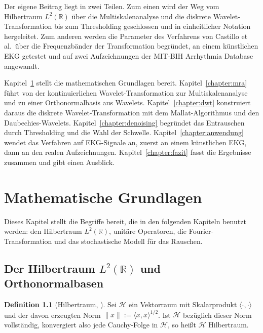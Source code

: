 \documentclass[a4paper,11pt,bibliography=totoc,listof=totoc,headinclude=true,cleardoublepage=empty,oneside]{scrbook}
\theoremstyle{plain}
\theoremstyle{definition}
\newtheorem{Definition}[Satz]{Definition}
\newcommand{\R}{\mathbb{R}}
\newcommand{\LZwei}{L^2(\R)}
\newcommand{\scal}[2]{\langle #1, #2 \rangle}
\newcommand{\norm}[1]{\lVert #1 \rVert}
\begin{document}
Der eigene Beitrag liegt in zwei Teilen. Zum einen wird der Weg vom
Hilbertraum $\LZwei$ über die Multiskalenanalyse und die diskrete
Wavelet-Transformation bis zum Thresholding geschlossen und in einheitlicher
Notation hergeleitet. Zum anderen werden die Parameter des Verfahrens von
Castillo et al.\ über die Frequenzbänder der Transformation begründet, an
einem künstlichen EKG getestet und auf zwei Aufzeichnungen der MIT-BIH
Arrhythmia Database angewandt.

Kapitel~\ref{chapter:grundlagen} stellt die mathematischen Grundlagen bereit.
Kapitel~\ref{chapter:mra} führt von der kontinuierlichen Wavelet-Transformation
zur Multiskalenanalyse und zu einer Orthonormalbasis aus Wavelets.
Kapitel~\ref{chapter:dwt} konstruiert daraus die diskrete
Wavelet-Transformation mit dem Mallat-Algorithmus und den Daubechies-Wavelets.
Kapitel~\ref{chapter:denoising} begründet das Entrauschen durch Thresholding
und die Wahl der Schwelle. Kapitel~\ref{chapter:anwendung} wendet das Verfahren
auf EKG-Signale an, zuerst an einem künstlichen EKG, dann an den realen
Aufzeichnungen. Kapitel~\ref{chapter:fazit} fasst die Ergebnisse zusammen und
gibt einen Ausblick.

\chapter{Mathematische Grundlagen}
\label{chapter:grundlagen}

Dieses Kapitel stellt die Begriffe bereit, die in den folgenden Kapiteln
benutzt werden: den Hilbertraum $\LZwei$, unitäre Operatoren, die
Fourier-Transformation und das stochastische Modell für das Rauschen.

\section{Der Hilbertraum \texorpdfstring{$L^2(\R)$}{L2(R)} und Orthonormalbasen}
\label{sec:l2}

\begin{Definition}[Hilbertraum, {\cite[Def.~25.5, Def.~25.7]{serov}}] %
\label{def:hilbertraum}
Sei $\mathcal H$ ein Vektorraum mit Skalarprodukt $\scal{\cdot}{\cdot}$ und der
davon erzeugten Norm $\norm{x} := \scal{x}{x}^{1/2}$. Ist $\mathcal H$
bezüglich dieser Norm vollständig, konvergiert also jede Cauchy-Folge in
$\mathcal H$, so hei\ss t $\mathcal H$ Hilbertraum.
\end{Definition}
\end{document}
